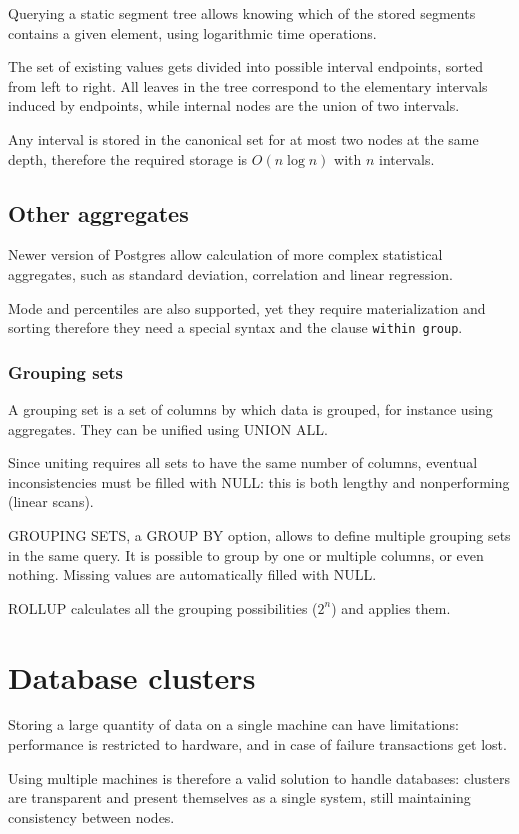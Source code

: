 Querying a static segment tree allows knowing which of the stored segments contains a given element, using logarithmic time operations.

The set of existing values gets divided into possible interval endpoints, sorted from left to right. All leaves in the tree correspond to the elementary intervals induced by endpoints, while internal nodes are the union of two intervals. 

Any interval is stored in the canonical set for at most two nodes at the same depth, therefore the required storage is $O(n \log n)$ with $n$ intervals.

\subsection{Other aggregates}
Newer version of Postgres allow calculation of more complex statistical aggregates, such as standard deviation, correlation and linear regression.

Mode and percentiles are also supported, yet they require materialization and sorting therefore they need a special syntax and the clause \texttt{within group}.

\subsubsection{Grouping sets}
A grouping set is a set of columns by which data is grouped, for instance using aggregates. They can be unified using UNION ALL.

Since uniting requires all sets to have the same number of columns, eventual inconsistencies must be filled with NULL: this is both lengthy and nonperforming (linear scans).

GROUPING SETS, a GROUP BY option, allows to define multiple grouping sets in the same query. It is possible to group by one or multiple columns, or even nothing. Missing values are automatically filled with NULL.

ROLLUP calculates all the grouping possibilities ($2^n$) and applies them. 

\section{Database clusters}
Storing a large quantity of data on a single machine can have limitations: performance is restricted to hardware, and in case of failure transactions get lost. 

Using multiple machines is therefore a valid solution to handle databases: clusters are transparent and present themselves as a single system, still maintaining consistency between nodes. 

